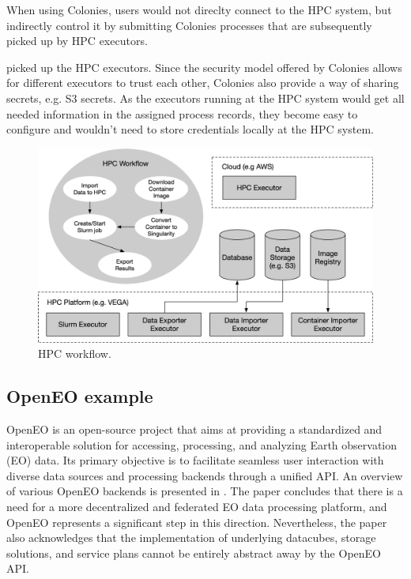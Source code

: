 \documentclass{article}
\begin{document}
When using Colonies, users would not direclty connect to the HPC system, but indirectly control it by submitting Colonies processes that are subsequently picked up by HPC executors. 

picked up the HPC executors. Since the security model offered by Colonies allows for different executors to trust each other, Colonies also provide a way of sharing secrets, e.g. S3 secrets. As the executors running at the HPC system would get all needed information in the assigned process records, they become easy to configure and wouldn't need to store credentials locally at the HPC system.  

\begin{figure}[h]
	\centering
    \includegraphics[scale=0.43]{hpc_workflow.png}
	\caption{HPC workflow.}
	\label{fig:hpc_workflow}
\end{figure}

\subsection{OpenEO example}
OpenEO \cite{openeo} is an open-source project that aims at providing a standardized and interoperable solution for accessing, processing, and analyzing Earth observation (EO) data. Its primary objective is to facilitate seamless user interaction with diverse data sources and processing backends through a unified API. An overview of various OpenEO backends is presented in \cite{openeo_backends}. The paper concludes that there is a need for a more decentralized and federated EO data processing platform, and OpenEO represents a significant step in this direction. Nevertheless, the paper also acknowledges that the implementation of underlying datacubes, storage solutions, and service plans cannot be entirely abstract away by the OpenEO API.
\end{document}

